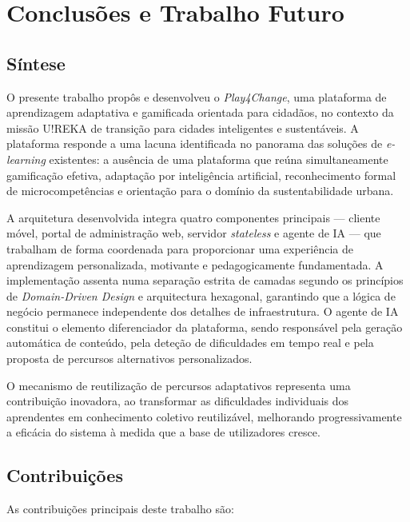 %
%
\chapter{Conclusões e Trabalho Futuro}
\label{cha:conclusoes}

\section{Síntese}
\label{sec:sintese}

O presente trabalho propôs e desenvolveu o \textit{Play4Change}, uma plataforma de aprendizagem adaptativa e gamificada orientada para cidadãos, no contexto da missão U!REKA de transição para cidades inteligentes e sustentáveis. A plataforma responde a uma lacuna identificada no panorama das soluções de \textit{e-learning} existentes: a ausência de uma plataforma que reúna simultaneamente gamificação efetiva, adaptação por inteligência artificial, reconhecimento formal de microcompetências e orientação para o domínio da sustentabilidade urbana.

A arquitetura desenvolvida integra quatro componentes principais — cliente móvel, portal de administração web, servidor \textit{stateless} e agente de IA --- que trabalham de forma coordenada para proporcionar uma experiência de aprendizagem personalizada, motivante e pedagogicamente fundamentada. A implementação assenta numa separação estrita de camadas segundo os princípios de \textit{Domain-Driven Design} e arquitectura hexagonal, garantindo que a lógica de negócio permanece independente dos detalhes de infraestrutura. O agente de IA constitui o elemento diferenciador da plataforma, sendo responsável pela geração automática de conteúdo, pela deteção de dificuldades em tempo real e pela proposta de percursos alternativos personalizados.

O mecanismo de reutilização de percursos adaptativos representa uma contribuição inovadora, ao transformar as dificuldades individuais dos aprendentes em conhecimento coletivo reutilizável, melhorando progressivamente a eficácia do sistema à medida que a base de utilizadores cresce.

\section{Contribuições}
\label{sec:contribuicoes_conclusao}

As contribuições principais deste trabalho são:

